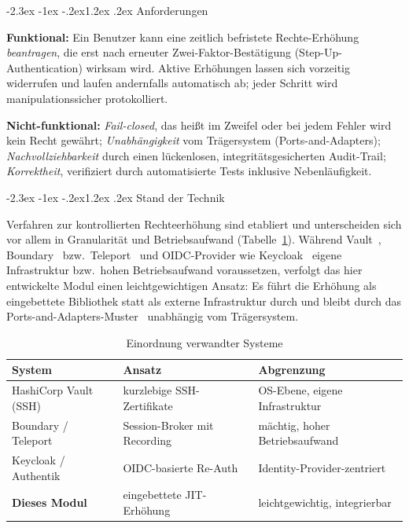 \documentclass[11pt,a4paper]{article}
\makeatletter
\renewcommand\section{\@startsection{section}{1}{\z@}%
  {-2.3ex \@plus -1ex \@minus -.2ex}{1.2ex \@plus .2ex}%
  {\normalfont\Large\bfseries}}
\makeatother
\begin{document}
\section{Anforderungen}

\textbf{Funktional:} Ein Benutzer kann eine zeitlich befristete
Rechte-Erhöhung \emph{beantragen}, die erst nach erneuter
Zwei-Faktor-Bestätigung (Step-Up-Authentication) wirksam wird. Aktive
Erhöhungen lassen sich vorzeitig widerrufen und laufen andernfalls automatisch
ab; jeder Schritt wird manipulationssicher protokolliert.

\textbf{Nicht-funktional:} \emph{Fail-closed}, das heißt im Zweifel oder bei
jedem Fehler wird kein Recht gewährt; \emph{Unabhängigkeit} vom Trägersystem
(Ports-and-Adapters); \emph{Nachvollziehbarkeit} durch einen lückenlosen,
integritätsgesicherten Audit-Trail; \emph{Korrektheit}, verifiziert durch
automatisierte Tests inklusive Nebenläufigkeit.

\section{Stand der Technik}

Verfahren zur kontrollierten Rechteerhöhung sind etabliert und unterscheiden
sich vor allem in Granularität und Betriebsaufwand (Tabelle~\ref{tab:sota}).
Während Vault~\cite{vault}, Boundary~\cite{boundary} bzw.\
Teleport~\cite{teleport} und OIDC-Provider wie Keycloak~\cite{keycloak} eigene
Infrastruktur bzw.\ hohen Betriebsaufwand voraussetzen, verfolgt das hier
entwickelte Modul einen leichtgewichtigen Ansatz: Es führt die Erhöhung als
eingebettete Bibliothek statt als externe Infrastruktur durch und bleibt durch
das Ports-and-Adapters-Muster~\cite{hexagonal} unabhängig vom Trägersystem.

\begin{table}[htbp]
  \centering
  \caption{Einordnung verwandter Systeme}
  \label{tab:sota}
  \begin{tabular}{@{}lll@{}}
    \toprule
    \textbf{System} & \textbf{Ansatz} & \textbf{Abgrenzung} \\
    \midrule
    HashiCorp Vault (SSH)      & kurzlebige SSH-Zertifikate     & OS-Ebene, eigene Infrastruktur \\
    Boundary / Teleport        & Session-Broker mit Recording   & mächtig, hoher Betriebsaufwand \\
    Keycloak / Authentik       & OIDC-basierte Re-Auth          & Identity-Provider-zentriert \\
    \textbf{Dieses Modul}      & eingebettete JIT-Erhöhung      & leichtgewichtig, integrierbar \\
    \bottomrule
  \end{tabular}
\end{table}
\end{document}
